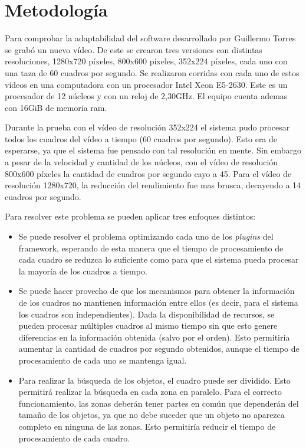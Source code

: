 
\section{Metodología}

Para comprobar la adaptabilidad del software desarrollado por Guillermo Torres
se grabó un nuevo vídeo. De este se crearon tres versiones con distintas
resoluciones, 1280x720 píxeles, 800x600 píxeles, 352x224 píxeles, cada uno con
una taza de 60 cuadros por segundo. Se realizaron corridas con cada uno de estos
vídeos en una computadora con un procesador Intel Xeon E5-2630. Este es un
procesador de 12 núcleos y con un reloj de 2,30GHz. El equipo cuenta ademas con
16GiB de memoria ram.

Durante la prueba con el vídeo de resolución 352x224 el sistema pudo procesar
todos los cuadros del vídeo a tiempo (60 cuadros por segundo). Esto era de
esperarse, ya que el sistema fue pensado con tal resolución en mente. Sin
embargo a pesar de la velocidad y cantidad de los núcleos, con el vídeo de
resolución 800x600 píxeles la cantidad de cuadros por segundo cayo a 45. Para el
vídeo de resolución 1280x720, la reducción del rendimiento fue mas brusca,
decayendo a 14 cuadros por segundo.

Para resolver este problema se pueden aplicar tres enfoques distintos:

\begin{itemize}

\item	Se puede resolver el problema optimizando cada uno de los \emph{plugins}
	del framework, esperando de esta manera que el tiempo de procesamiento
	de cada cuadro se reduzca lo suficiente como para que el sistema pueda
	procesar la mayoría de los cuadros a tiempo.

\item	Se puede hacer provecho de que los mecanismos para obtener la
	información de los cuadros no mantienen información entre ellos (es
	decir, para el sistema los cuadros son independientes). Dada la
	disponibilidad de recursos, se pueden procesar múltiples cuadros al
	mismo tiempo sin que esto genere diferencias en la información obtenida
	(salvo por el orden). Esto permitiría aumentar la cantidad de cuadros
	por segundo obtenidos, aunque el tiempo de procesamiento de cada uno se
	mantenga igual.

\item	Para realizar la búsqueda de los objetos, el cuadro puede ser dividido.
	Esto permitirá realizar la búsqueda en cada zona en paralelo. Para el
	correcto funcionamiento, las zonas deberán tener partes en común que
	dependerán del tamaño de los objetos, ya que no debe suceder que un
	objeto no aparezca completo en ninguna de las zonas. Esto permitiría
	reducir el tiempo de procesamiento de cada cuadro.

\end{itemize}

